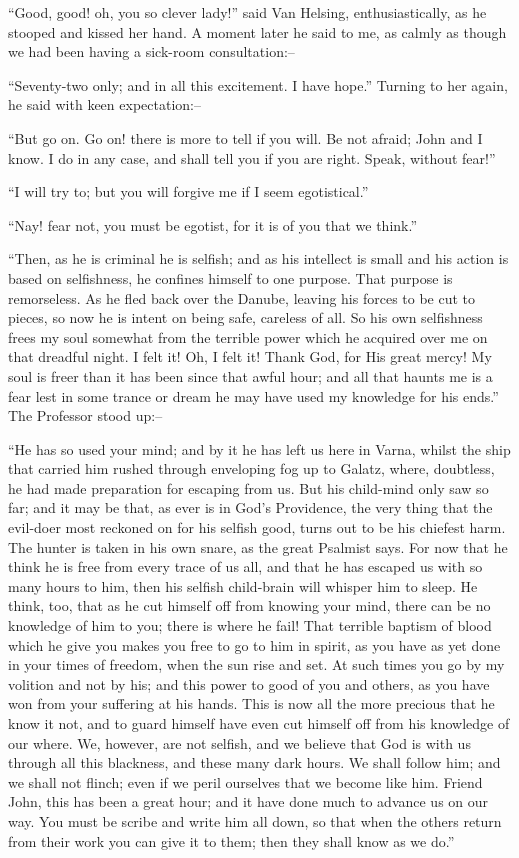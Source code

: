 \documentclass[12pt,openright]{book}
\begin{document}
“Good, good! oh, you so clever lady!” said Van Helsing, enthusiastically, as he stooped and kissed her hand. A moment later he said to me, as calmly as though we had been having a sick-room consultation:–

“Seventy-two only; and in all this excitement. I have hope.” Turning to her again, he said with keen expectation:–

“But go on. Go on! there is more to tell if you will. Be not afraid; John and I know. I do in any case, and shall tell you if you are right. Speak, without fear!”

“I will try to; but you will forgive me if I seem egotistical.”

“Nay! fear not, you must be egotist, for it is of you that we think.”

“Then, as he is criminal he is selfish; and as his intellect is small and his action is based on selfishness, he confines himself to one purpose. That purpose is remorseless. As he fled back over the Danube, leaving his forces to be cut to pieces, so now he is intent on being safe, careless of all. So his own selfishness frees my soul somewhat from the terrible power which he acquired over me on that dreadful night. I felt it! Oh, I felt it! Thank God, for His great mercy! My soul is freer than it has been since that awful hour; and all that haunts me is a fear lest in some trance or dream he may have used my knowledge for his ends.” The Professor stood up:–

“He has so used your mind; and by it he has left us here in Varna, whilst the ship that carried him rushed through enveloping fog up to Galatz, where, doubtless, he had made preparation for escaping from us. But his child-mind only saw so far; and it may be that, as ever is in God’s Providence, the very thing that the evil-doer most reckoned on for his selfish good, turns out to be his chiefest harm. The hunter is taken in his own snare, as the great Psalmist says. For now that he think he is free from every trace of us all, and that he has escaped us with so many hours to him, then his selfish child-brain will whisper him to sleep. He think, too, that as he cut himself off from knowing your mind, there can be no knowledge of him to you; there is where he fail! That terrible baptism of blood which he give you makes you free to go to him in spirit, as you have as yet done in your times of freedom, when the sun rise and set. At such times you go by my volition and not by his; and this power to good of you and others, as you have won from your suffering at his hands. This is now all the more precious that he know it not, and to guard himself have even cut himself off from his knowledge of our where. We, however, are not selfish, and we believe that God is with us through all this blackness, and these many dark hours. We shall follow him; and we shall not flinch; even if we peril ourselves that we become like him. Friend John, this has been a great hour; and it have done much to advance us on our way. You must be scribe and write him all down, so that when the others return from their work you can give it to them; then they shall know as we do.”
\end{document}
